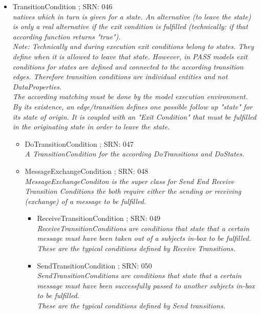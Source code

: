 \begin{itemize}
\begin{itemize}
\begin{itemize}
\begin{itemize}
\begin{itemize}
			\end{itemize}
			\item TransitionCondition ; SRN: 046 \\ \textit{natives which in turn is given for a state. An alternative (to leave the state) is only a real alternative if the exit condition is fulfilled (technically: if that according function returns "true"). \\Note: Technically and during execution exit conditions belong to states. They define when it is allowed to leave that state. However, in PASS models exit conditions for states are defined and connected to the according transition edges. Therefore transition conditions are individual entities and not DataProperties.\\ The according matching must be done by the model execution environment.\\ By its existence, an edge/transition defines one possible follow up "state" for its state of origin. It is coupled with an "Exit Condition" that must be fulfilled in the originating state in order to leave the state.}
			\begin{itemize}
				\item DoTransitionCondition ; SRN: 047 \\ \textit{A TransitionCondition for the according DoTransitions and DoStates. }
				\item MessageExchangeCondition ; SRN: 048 \\ \textit{MessageExchangeConditon is the super class for Send End Receive Transition Conditions the both require either the sending or receiving (exchange) of a message to be fulfilled.}
				\begin{itemize}
					\item ReceiveTransitionCondition ; SRN: 049 \\ \textit{ReceiveTransitionConditions are conditions that state that a certain message must have been taken out of a subjects in-box to be fulfilled.\\ These are the typical conditions defined by Receive Transitions.}
					\item SendTransitionCondition ; SRN: 050 \\ \textit{SendTransitionConditions are conditions that state that a certain message must have been successfully passed to another subjects in-box to be fulfilled.\\ These are the typical conditions defined by Send transitions.}
				\end {itemize}

\end{itemize}
\end{itemize}
\end{itemize}
\end{itemize}
\end{itemize}
